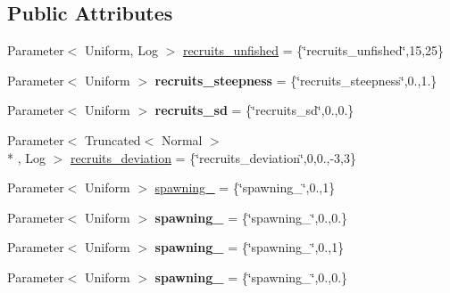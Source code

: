 \subsection*{Public Attributes}
\begin{DoxyCompactItemize}
\item 
Parameter$<$ Uniform, Log $>$ \hyperlink{classIOSKJ_1_1Parameters_a8923bdd52289ed5e29436b222121927e}{recruits\-\_\-unfished} = \{\char`\"{}recruits\-\_\-unfished\char`\"{},15,25\}
\item 
\hypertarget{classIOSKJ_1_1Parameters_aa8c53cd54a5fa2c62ac3f5043e5af640}{Parameter$<$ Uniform $>$ {\bfseries recruits\-\_\-steepness} = \{\char`\"{}recruits\-\_\-steepness\char`\"{},0.,1.\}}\label{classIOSKJ_1_1Parameters_aa8c53cd54a5fa2c62ac3f5043e5af640}

\item 
\hypertarget{classIOSKJ_1_1Parameters_aa83d184e0eaf4b852fe483e70ae7e0a6}{Parameter$<$ Uniform $>$ {\bfseries recruits\-\_\-sd} = \{\char`\"{}recruits\-\_\-sd\char`\"{},0.,0.\}}\label{classIOSKJ_1_1Parameters_aa83d184e0eaf4b852fe483e70ae7e0a6}

\item 
Parameter$<$ Truncated$<$ Normal $>$\\*
, Log $>$ \hyperlink{classIOSKJ_1_1Parameters_a083c2112ccc41ef2b0788feb08bee150}{recruits\-\_\-deviation} = \{\char`\"{}recruits\-\_\-deviation\char`\"{},0,0.,-\/3,3\}
\item 
Parameter$<$ Uniform $>$ \hyperlink{classIOSKJ_1_1Parameters_a28bbbb27c4d4ae15fa93469b93553fd6}{spawning\-\_} = \{\char`\"{}spawning\-\_\char`\"{},0.,1\}
\item 
\hypertarget{classIOSKJ_1_1Parameters_aeef621e20370efdd7f5233835109a656}{Parameter$<$ Uniform $>$ {\bfseries spawning\-\_} = \{\char`\"{}spawning\-\_\char`\"{},0.,0.\}}\label{classIOSKJ_1_1Parameters_aeef621e20370efdd7f5233835109a656}

\item 
\hypertarget{classIOSKJ_1_1Parameters_a19e1a0c82f66a22b835f960f9275b3e5}{Parameter$<$ Uniform $>$ {\bfseries spawning\-\_} = \{\char`\"{}spawning\-\_\char`\"{},0.,1\}}\label{classIOSKJ_1_1Parameters_a19e1a0c82f66a22b835f960f9275b3e5}

\item 
\hypertarget{classIOSKJ_1_1Parameters_a8a42034667ab64402a2506525865d106}{Parameter$<$ Uniform $>$ {\bfseries spawning\-\_} = \{\char`\"{}spawning\-\_\char`\"{},0.,0.\}}\label{classIOSKJ_1_1Parameters_a8a42034667ab64402a2506525865d106}


\end{DoxyCompactItemize}
